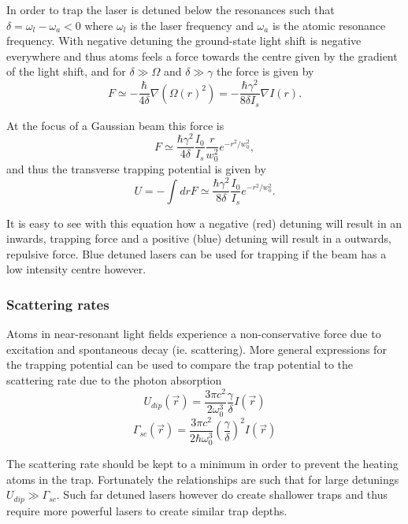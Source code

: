In order to trap the laser is detuned below the resonances such that $\delta = \omega_l - \omega_a < 0$ where $\omega_l$ is the laser frequency and $\omega_a$ is the atomic resonance frequency. With negative detuning the ground-state light shift is negative everywhere and thus atoms feels a force towards the centre given by the gradient of the light shift, and for $\delta \gg \Omega$ and $\delta \gg \gamma$ the force is given by
\begin{equation}
F \simeq - \frac{\hbar}{4\delta} \nabla(\Omega(r)^2) = -\frac{\hbar \gamma^2}{8\delta I_s} \nabla I (r).
\end{equation}

At the focus of a Gaussian beam this force is
\begin{equation}
F \simeq \frac{\hbar \gamma^2}{4 \delta} \frac{I_0}{I_s} \frac{r}{w_0^2} e^{-r^2/w_0^2},
\end{equation}
and thus the transverse trapping potential is given by
\begin{equation}
U = -\int dr F \simeq \frac{\hbar \gamma^2}{8\delta} \frac{I_0}{I_s} e^{-r^2/w_0^2}.
\end{equation}

It is easy to see with this equation how a negative (red) detuning will result in an inwards, trapping force and a positive (blue) detuning will result in a outwards, repulsive force. Blue detuned lasers can be used for trapping if the beam has a low intensity centre however\cite{davidson_long_1995, lee_raman_1996, ozeri_long_1999, friedman_compression_2000}.

\subsubsection{Scattering rates}
Atoms in near-resonant light fields experience a non-conservative force due to excitation and spontaneous decay (ie. scattering). More general expressions for the trapping potential can be used to compare the trap potential to the scattering rate due to the photon absorption\cite{grimm_optical_2000}
\begin{equation}
U_{dip}(\vec{r})=\frac{3\pi c^2}{2\omega_0^3} \frac{\gamma}{\delta} I(\vec{r})
\end{equation}
\begin{equation}
\Gamma_{sc}(\vec{r})=\frac{3\pi c^2}{2\hbar \omega_0^3}\left(\frac{\gamma}{\delta}\right)^2 I(\vec{r})
\end{equation}

The scattering rate should be kept to a minimum in order to prevent the heating atoms in the trap. Fortunately the relationships are such that for large detunings $U_{dip}\gg\Gamma_{sc}$. Such far detuned lasers however do create shallower traps and thus require more powerful lasers to create similar trap depths.

